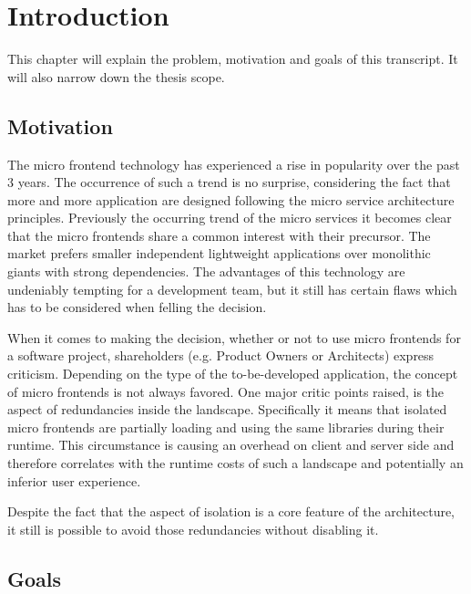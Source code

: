 \chapter{Introduction} %
\label{Chapter1}


This chapter will explain the problem, motivation and goals of this transcript. 
It will also narrow down the thesis scope.

\section{Motivation}

The micro frontend technology has experienced a rise in popularity over the past 3 years. The occurrence of such a trend is no surprise, considering the fact that more and more application are designed following the micro service architecture principles.\cite{google_micro_frontend_trends} 
Previously the occurring trend of the micro services it becomes clear that the micro frontends share a common interest with their precursor.
The market prefers smaller independent lightweight applications over monolithic giants with strong dependencies. The advantages of this technology are undeniably tempting for a development team, but it still has certain flaws which has to be considered when felling the decision.\cite{Yang_2019}

When it comes to making the decision, whether or not to use micro frontends for a software project, shareholders (e.g. Product Owners or Architects) express criticism. Depending on the type of the to-be-developed application, the concept of micro frontends is not always favored. One major critic points raised, is the aspect of redundancies inside the landscape. Specifically it means that isolated micro frontends are partially loading and using the same libraries during their runtime. This circumstance is causing an overhead on client and server side and therefore correlates with the runtime costs of such a landscape and potentially an inferior user experience.\cite{motivation_benefits_adopting_MFs}

Despite the fact that the aspect of isolation is a core feature of the architecture, it still is possible to avoid those redundancies without disabling it.

\section{Goals}


